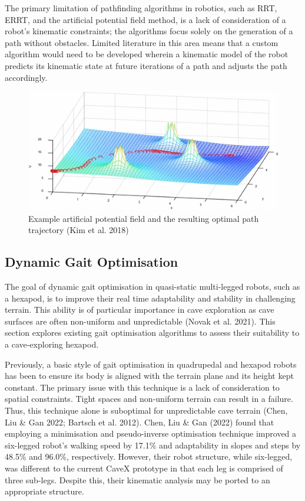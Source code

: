 The primary limitation of pathfinding algorithms in robotics, such as RRT, ERRT, and the artificial potential field method, is a lack of consideration of a robot's kinematic constraints; the algorithms focus solely on the generation of a path without obstacles. Limited literature in this area means that a custom algorithm would need to be developed wherein a kinematic model of the robot predicts its kinematic state at future iterations of a path and adjusts the path accordingly.

\begin{figure}[H]
    \centering
    \includegraphics[scale=0.6]{images/artificialPotentialField.png}
    \caption{Example artificial potential field and the resulting optimal path trajectory (Kim et al. 2018)}
    \label{fig:artifical_potential_field}
\end{figure}

\subsection{Dynamic Gait Optimisation}

The goal of dynamic gait optimisation in quasi-static multi-legged robots, such as a hexapod, is to improve their real time adaptability and stability in challenging terrain. This ability is of particular importance in cave exploration as cave surfaces are often non-uniform and unpredictable (Novak et al. 2021). This section explores existing gait optimisation algorithms to assess their suitability to a cave-exploring hexapod.

Previously, a basic style of gait optimisation in quadrupedal and hexapod robots has been to ensure its body is aligned with the terrain plane and its height kept constant. The primary issue with this technique is a lack of consideration to spatial constraints. Tight spaces and non-uniform terrain can result in a failure. Thus, this technique alone is suboptimal for unpredictable cave terrain (Chen, Liu \& Gan 2022; Bartsch et al. 2012). Chen, Liu \& Gan (2022) found that employing a minimisation and pseudo-inverse optimisation technique improved a six-legged robot's walking speed by 17.1\% and adaptability in slopes and steps by 48.5\% and 96.0\%, respectively. However, their robot structure, while six-legged, was different to the current CaveX prototype in that each leg is comprised of three sub-legs. Despite this, their kinematic analysis may be ported to an appropriate structure.

